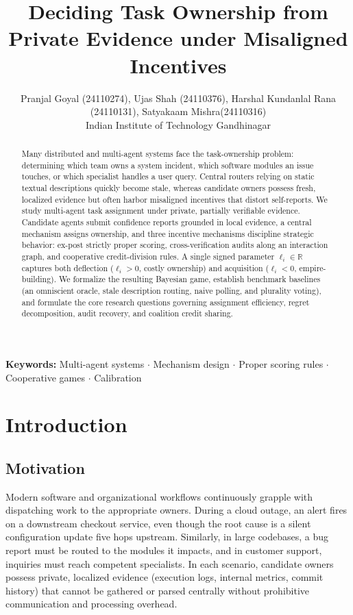\documentclass{article}
\title{Deciding Task Ownership from Private Evidence under Misaligned Incentives
}
\author{
  Pranjal Goyal (24110274), Ujas Shah (24110376), Harshal Kundanlal Rana (24110131), Satyakaam Mishra(24110316) \\
  Indian Institute of Technology Gandhinagar \\
}
\theoremstyle{definition}
\begin{document}
\maketitle

\begin{abstract}
\noindent Many distributed and multi-agent systems face the task-ownership problem: determining which team owns a system incident, which software modules an issue touches, or which specialist handles a user query. Central routers relying on static textual descriptions quickly become stale, whereas candidate owners possess fresh, localized evidence but often harbor misaligned incentives that distort self-reports. We study multi-agent task assignment under private, partially verifiable evidence. Candidate agents submit confidence reports grounded in local evidence, a central mechanism assigns ownership, and three incentive mechanisms discipline strategic behavior: ex-post strictly proper scoring, cross-verification audits along an interaction graph, and cooperative credit-division rules. A single signed parameter $\ell_i \in \mathbb{R}$ captures both deflection ($\ell_i > 0$, costly ownership) and acquisition ($\ell_i < 0$, empire-building). We formalize the resulting Bayesian game, establish benchmark baselines (an omniscient oracle, stale description routing, naive polling, and plurality voting), and formulate the core research questions governing assignment efficiency, regret decomposition, audit recovery, and coalition credit sharing.
\end{abstract}

\noindent \textbf{Keywords:} Multi-agent systems $\cdot$ Mechanism design $\cdot$ Proper scoring rules $\cdot$ Cooperative games $\cdot$ Calibration

\vspace{0.4cm}

\section{Introduction}

\subsection{Motivation}
Modern software and organizational workflows continuously grapple with dispatching work to the appropriate owners. During a cloud outage, an alert fires on a downstream checkout service, even though the root cause is a silent configuration update five hops upstream. Similarly, in large codebases, a bug report must be routed to the modules it impacts, and in customer support, inquiries must reach competent specialists. In each scenario, candidate owners possess private, localized evidence (execution logs, internal metrics, commit history) that cannot be gathered or parsed centrally without prohibitive communication and processing overhead.
\end{document}
